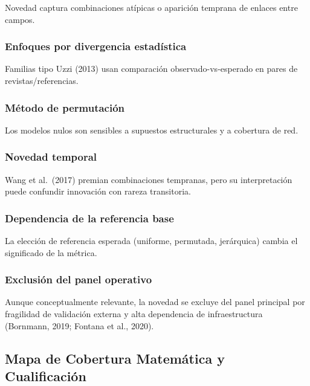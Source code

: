\documentclass[
]{article}
\begin{document}
Novedad captura combinaciones atípicas o aparición temprana de enlaces
entre campos.

\hypertarget{enfoques-por-divergencia-estaduxedstica}{%
\subsubsection{Enfoques por divergencia
estadística}\label{enfoques-por-divergencia-estaduxedstica}}

Familias tipo Uzzi (2013) usan comparación observado-vs-esperado en
pares de revistas/referencias.

\hypertarget{muxe9todo-de-permutaciuxf3n}{%
\subsubsection{Método de
permutación}\label{muxe9todo-de-permutaciuxf3n}}

Los modelos nulos son sensibles a supuestos estructurales y a cobertura
de red.

\hypertarget{novedad-temporal}{%
\subsubsection{Novedad temporal}\label{novedad-temporal}}

Wang et al.~(2017) premian combinaciones tempranas, pero su
interpretación puede confundir innovación con rareza transitoria.

\hypertarget{dependencia-de-la-referencia-base}{%
\subsubsection{Dependencia de la referencia
base}\label{dependencia-de-la-referencia-base}}

La elección de referencia esperada (uniforme, permutada, jerárquica)
cambia el significado de la métrica.

\hypertarget{exclusiuxf3n-del-panel-operativo}{%
\subsubsection{Exclusión del panel
operativo}\label{exclusiuxf3n-del-panel-operativo}}

Aunque conceptualmente relevante, la novedad se excluye del panel
principal por fragilidad de validación externa y alta dependencia de
infraestructura (Bornmann, 2019; Fontana et al., 2020).

\hypertarget{mapa-de-cobertura-matemuxe1tica-y-cualificaciuxf3n}{%
\subsection{Mapa de Cobertura Matemática y
Cualificación}\label{mapa-de-cobertura-matemuxe1tica-y-cualificaciuxf3n}}
\end{document}
